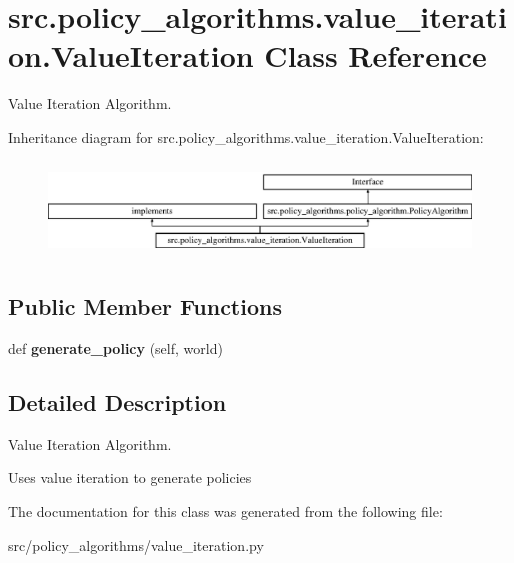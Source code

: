 \hypertarget{classsrc_1_1policy__algorithms_1_1value__iteration_1_1_value_iteration}{}\section{src.\+policy\+\_\+algorithms.\+value\+\_\+iteration.\+Value\+Iteration Class Reference}
\label{classsrc_1_1policy__algorithms_1_1value__iteration_1_1_value_iteration}


Value Iteration Algorithm.  


Inheritance diagram for src.\+policy\+\_\+algorithms.\+value\+\_\+iteration.\+Value\+Iteration\+:\begin{figure}[H]
\begin{center}
\leavevmode
\includegraphics[height=2.560976cm]{classsrc_1_1policy__algorithms_1_1value__iteration_1_1_value_iteration}
\end{center}
\end{figure}
\subsection*{Public Member Functions}
\begin{DoxyCompactItemize}
\item 
\mbox{\label{classsrc_1_1policy__algorithms_1_1value__iteration_1_1_value_iteration_a4d494ddb4ea4ce78858f5ee0b113a401}} 
def {\bfseries generate\+\_\+policy} (self, world)
\end{DoxyCompactItemize}


\subsection{Detailed Description}
Value Iteration Algorithm. 

Uses value iteration to generate policies 

The documentation for this class was generated from the following file\+:\begin{DoxyCompactItemize}
\item 
src/policy\+\_\+algorithms/value\+\_\+iteration.\+py\end{DoxyCompactItemize}
